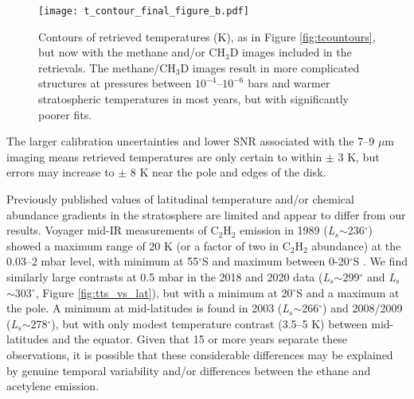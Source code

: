 \documentclass[twocolumn,10pt]{aastex631}
\begin{document}
\begin{figure*}[h]
    \centering
    \texttt{[image: t\_contour\_final\_figure\_b.pdf]}
    \caption{Contours of retrieved temperatures (K), as in Figure \ref{fig:tcountours}, but now with the methane and/or CH$_3$D images included in the retrievals. The methane/CH$_3$D images result in more complicated structures at pressures between $10^{-4}$--$10^{-6}$ bars and warmer stratospheric temperatures in most years, but with significantly poorer fits.}
    \label{fig:tcontoursch4} 
\end{figure*}

The larger calibration uncertainties and lower SNR associated with the 7--9 $\mu$m imaging means retrieved temperatures are only certain to within $\pm$ 3 K, but errors may increase to $\pm$ 8 K near the pole and edges of the disk. %

Previously published values of latitudinal temperature and/or chemical abundance gradients in the stratosphere are limited and appear to differ from our results. Voyager mid-IR measurements of C$_2$H$_2$ emission in 1989 (\textit{L$_s$}$\sim$236$^{\circ}$) showed a maximum range of 20 K (or a factor of two in C$_2$H$_2$ abundance) at the 0.03--2 mbar level, with minimum at 55$^{\circ}$S and maximum between 0-20$^{\circ}$S \citep{bezard1991hydrocarbons}. We find similarly large contrasts at 0.5 mbar in the 2018 and 2020 data (\textit{L$_s$}$\sim$299$^{\circ}$ and \textit{L$_s$}$\sim$303$^{\circ}$, Figure \ref{fig:tts_vs_lat}), but with a minimum at 20$^{\circ}$S and a maximum at the pole. A minimum at mid-latitudes is found in 2003 (\textit{L$_s$}$\sim$266$^{\circ}$) and 2008/2009 (\textit{L$_s$}$\sim$278$^{\circ}$), but with only modest temperature contrast (3.5--5 K) between mid-latitudes and the equator. Given that 15 or more years separate these observations, it is possible that these considerable differences may be explained by genuine temporal variability and/or differences between the ethane and acetylene emission.
\end{document}
